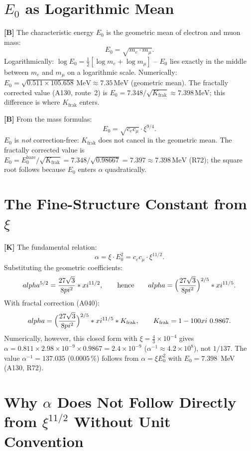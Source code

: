 \section{$E_0$ as Logarithmic Mean}

\textbf{[B]} The characteristic energy $E_0$ is the geometric mean of electron
and muon mass:
\[
  \boxed{E_0 = \sqrt{m_e\cdot m_\mu}}.
\]
Logarithmically: $\log E_0 = \tfrac12[\log m_e+\log m_\mu]$ -- $E_0$ lies exactly
in the middle between $m_e$ and $m_\mu$ on a logarithmic scale. Numerically:
$E_0 = \sqrt{0{.}511\times105{.}658}\,\text{MeV}\approx7{.}35\,\text{MeV}$
(geometric mean). The fractally corrected value (A130, route~2) is $E_0 = 7{.}348/\sqrt{K_\text{frak}}\approx7{.}398\,\text{MeV}$;
this difference is where $K_\text{frak}$ enters. 

\textbf{[B]} From the mass formulas:
\[
  E_0 = \sqrt{c_ec_\mu}\cdot\xi^{9/4}.
\]
$E_0$ is \emph{not} correction-free: $K_\text{frak}$ does not cancel in the
geometric mean. The fractally corrected value is
$E_0 = E_0^\text{bare}/\sqrt{K_\text{frak}} = 7{.}348/\sqrt{0{.}98667} = 7{.}397\approx7{.}398\,\text{MeV}$
(R72); the square root follows because $E_0$ enters $\alpha$ quadratically.

\section{The Fine-Structure Constant from $\xi$}

\textbf{[K]} The fundamental relation:
\[
  \alpha = \xi\cdot E_0^2 = c_ec_\mu\cdot\xi^{11/2}.
\]
Substituting the geometric coefficients:
\[
  \alpha^{5/2} = \frac{27\sqrt3}{8\pi^2}\cdot\xi^{11/2},
  \qquad\text{hence}\qquad
  \alpha = \Bigl(\frac{27\sqrt3}{8\pi^2}\Bigr)^{2/5}\cdot\xi^{11/5}.
\]
With fractal correction (A040):
\[
  \alpha = \Bigl(\frac{27\sqrt3}{8\pi^2}\Bigr)^{2/5}\cdot\xi^{11/5}\cdot K_\text{frak},
  \qquad K_\text{frak}=1-100\xi\approx0{.}9867.
\]
Numerically, however, this closed form with $\xi = \tfrac43\times10^{-4}$ gives
$\alpha = 0{.}811\times2{.}98\times10^{-9}\times0{.}9867 = 2{.}4\times10^{-9}$
($\alpha^{-1}\approx4{.}2\times10^{8}$), not $1/137$. The value $\alpha^{-1} = 137{.}035$
($0{.}0005\,\%$) follows from $\alpha = \xi E_0^2$ with $E_0 = 7{.}398$~MeV (A130, R72).

\section{Why $\alpha$ Does Not Follow Directly from $\xi^{11/2}$ Without Unit Convention}

